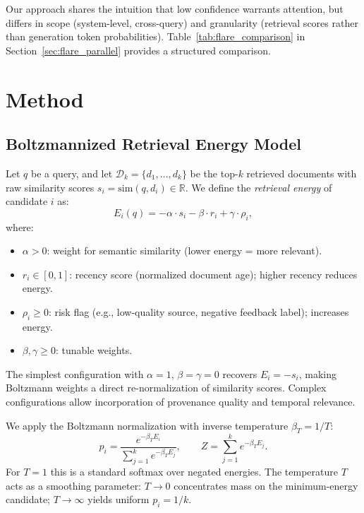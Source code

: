 \documentclass[11pt,a4paper]{article}
\theoremstyle{definition}
\begin{document}
Our approach shares the intuition that low confidence warrants
attention, but differs in scope (system-level, cross-query) and
granularity (retrieval scores rather than generation token probabilities).
Table~\ref{tab:flare_comparison} in Section~\ref{sec:flare_parallel}
provides a structured comparison.

\section{Method}
\label{sec:method}

\subsection{Boltzmannized Retrieval Energy Model}

Let $q$ be a query, and let $\mathcal{D}_k = \{d_1,\ldots,d_k\}$ be
the top-$k$ retrieved documents with raw similarity scores
$s_i = \text{sim}(q, d_i) \in \mathbb{R}$.
We define the \emph{retrieval energy} of candidate $i$ as:
\begin{equation}
  E_i(q) = -\alpha \cdot s_i - \beta \cdot r_i + \gamma \cdot \rho_i,
  \label{eq:energy}
\end{equation}
where:
\begin{itemize}[noitemsep]
  \item $\alpha > 0$: weight for semantic similarity (lower energy = more
    relevant).
  \item $r_i \in [0,1]$: recency score (normalized document age); higher
    recency reduces energy.
  \item $\rho_i \geq 0$: risk flag (e.g., low-quality source, negative
    feedback label); increases energy.
  \item $\beta, \gamma \geq 0$: tunable weights.
\end{itemize}

The simplest configuration with $\alpha=1$, $\beta=\gamma=0$ recovers
$E_i = -s_i$, making Boltzmann weights a direct re-normalization of
similarity scores.
Complex configurations allow incorporation of provenance quality and
temporal relevance.

We apply the Boltzmann normalization with inverse temperature $\beta_T = 1/T$:
\begin{equation}
  p_i = \frac{e^{-\beta_T E_i}}{\sum_{j=1}^{k} e^{-\beta_T E_j}},
  \qquad Z = \sum_{j=1}^{k} e^{-\beta_T E_j}.
  \label{eq:gibbs}
\end{equation}
For $T=1$ this is a standard softmax over negated energies.
The temperature $T$ acts as a smoothing parameter:
$T \to 0$ concentrates mass on the minimum-energy candidate;
$T \to \infty$ yields uniform $p_i = 1/k$.
\end{document}
